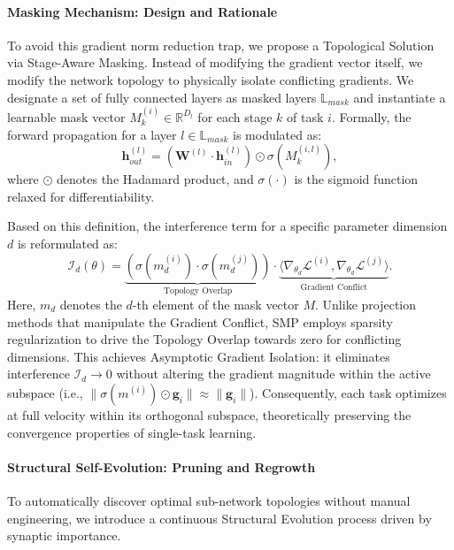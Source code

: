 \documentclass{article}
\begin{document}
\paragraph{Masking Mechanism: Design and Rationale}

To avoid this gradient norm reduction trap, we propose a Topological Solution via Stage-Aware Masking.
Instead of modifying the gradient vector itself, we modify the network topology to physically isolate conflicting gradients.
We designate a set of fully connected layers as masked layers $\mathbb{L}_{mask}$ and instantiate a learnable mask vector $M^{(i)}_{k} \in \mathbb{R}^{D_l}$ for each stage $k$ of task $i$.
Formally, the forward propagation for a layer $l \in \mathbb{L}_{mask}$ is modulated as:
\begin{equation}
\mathbf{h}^{(l)}_{out} = (\mathbf{W}^{(l)} \cdot \mathbf{h}^{(l)}_{in}) \odot \sigma(M^{(i,l)}_{k}),
\label{eq:mask_def}
\end{equation}
where $\odot$ denotes the Hadamard product, and $\sigma(\cdot)$ is the sigmoid function relaxed for differentiability.

Based on this definition, the interference term for a specific parameter dimension $d$ is reformulated as:
\begin{equation}
\mathcal{I}_d(\theta) = \underbrace{(\sigma(m_d^{(i)}) \cdot \sigma(m_d^{(j)}))}_{\text{Topology Overlap}} \cdot \underbrace{\langle \nabla_{\theta_d}\mathcal{L}^{(i)}, \nabla_{\theta_d}\mathcal{L}^{(j)} \rangle}_{\text{Gradient Conflict}}.
\label{eq:interference}
\end{equation}
Here, $m_d$ denotes the $d$-th element of the mask vector $M$.
Unlike projection methods that manipulate the Gradient Conflict, SMP employs sparsity regularization to drive the Topology Overlap towards zero for conflicting dimensions.
This achieves Asymptotic Gradient Isolation: it eliminates interference $\mathcal{I}_d \to 0$ without altering the gradient magnitude within the active subspace (i.e., $\| \sigma(m^{(i)}) \odot \mathbf{g}_i \| \approx \| \mathbf{g}_i \|$).
Consequently, each task optimizes at full velocity within its orthogonal subspace, theoretically preserving the convergence properties of single-task learning.

\paragraph{Structural Self-Evolution: Pruning and Regrowth} To automatically discover optimal sub-network topologies without manual engineering, we introduce a continuous Structural Evolution process driven by synaptic importance.
\end{document}
